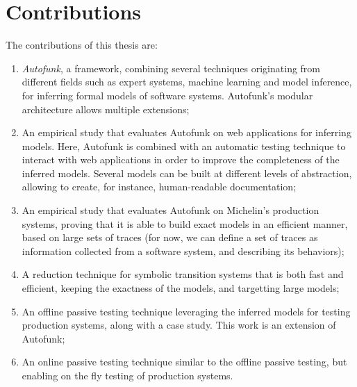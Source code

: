 \section{Contributions}
\label{sec:intro:contrib}

The contributions of this thesis are:

\begin{enumerate}
    \item \textit{Autofunk}, a framework, combining several
        techniques originating from different fields such as
        expert systems, machine learning and model inference, for
        inferring formal models of software systems. Autofunk's
        modular architecture allows multiple extensions;

    \item An empirical study that evaluates Autofunk on web
        applications for inferring models. Here, Autofunk is
        combined with an automatic testing technique to interact
        with web applications in order to improve the
        completeness of the inferred models. Several models can
        be built at different levels of abstraction, allowing to
        create, for instance, human-readable documentation;

    \item An empirical study that evaluates Autofunk on
        Michelin's production systems, proving that it is able to
        build exact models in an efficient manner, based on large
        sets of traces (for now, we can define a set of traces as
        information collected from a software system, and
        describing its behaviors);

    \item A reduction technique for symbolic transition systems
        that is both fast and efficient, keeping the exactness of
        the models, and targetting large models;

    \item An offline passive testing technique leveraging the
        inferred models for testing production systems, along
        with a case study. This work is an extension of Autofunk;

    \item An online passive testing technique similar to the
        offline passive testing, but enabling on the fly testing
        of production systems.
\end{enumerate}



